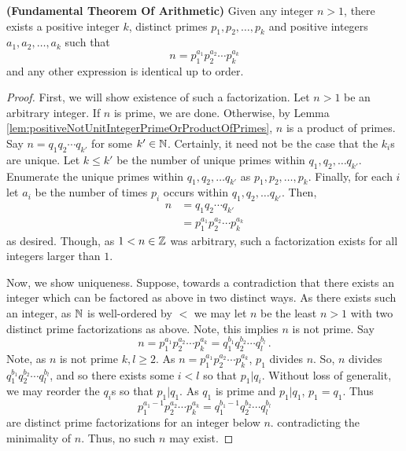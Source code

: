\guard








\begin{thm}
\label{thm:fundamentalTheoremOfArithmetic}
  \textbf{(Fundamental Theorem Of Arithmetic)}
  Given any integer $n>1$, there exists a positive integer $k$, distinct primes $p_1,p_2,\dots,p_k$ and positive integers $a_1,a_2,\dots,a_k$ such that \[ n=p_1^{a_1}p_2^{a_2}\cdots p_k^{a_k}\] and any other expression is identical up to order.
\end{thm}
\begin{proof}
  First, we will show existence of such a factorization.
  Let $n>1$ be an arbitrary integer.
  If $n$ is prime, we are done.
  Otherwise, by Lemma \ref{lem:positiveNotUnitIntegerPrimeOrProductOfPrimes}, $n$ is a product of primes.
  Say $n = q_1q_2\cdots q_{k'}$ for some $k'\in\mathbb{N}$.
  Certainly, it need not be the case that the $k_i$s are unique.
  Let $k\leq k'$ be the number of unique primes within $q_1,q_2,\dots q_{k'}$.
  Enumerate the unique primes within $q_1,q_2,\dots q_{k'}$ as $p_1,p_2,\dots,p_k$.
  Finally, for each $i$ let $a_i$ be the number of times $p_i$ occurs within  $q_1,q_2,\dots q_{k'}$.
  Then,
  \begin{align*}
    n &= q_1q_2\cdots q_{k'} \\
      &= p_1^{a_1}p_2^{a_2}\cdots p_k^{a_k}
  \end{align*}
  as desired.
  Though, as $1<n\in\mathbb{Z}$ was arbitrary, such a factorization exists for all integers larger than $1$.


  Now, we show uniqueness.
  Suppose, towards a contradiction that there exists an integer which can be factored as above in two distinct ways.
  As there exists such an integer, as $\mathbb{N}$ is well-ordered by $<$ we may let $n$ be the least $n>1$ with two distinct prime factorizations as above.
  Note, this implies $n$ is not prime.
  Say \[n=p_1^{a_1}p_2^{a_2}\cdots p_k^{a_k} =q_1^{b_1}q_2^{b_2}\cdots q_l^{b_l}\,.\]
  Note, as $n$ is not prime $k,l\geq 2$.
  As $n=p_1^{a_1}p_2^{a_2}\cdots p_k^{a_k}$, $p_1$ divides $n$.
  So, $n$ divides $q_1^{b_1}q_2^{b_2}\cdots q_l^{b_l}$, and so there exists some $i<l$ so that $p_1\vert q_i$.
  Without loss of generalit, we may reorder the $q_i$s so that $p_1\vert q_1$.
  As $q_1$ is prime and $p_1\vert q_1$, $p_1=q_1$.
  Thus \[ p_1^{a_1-1}p_2^{a_2}\cdots p_k^{a_k} = q_1^{b_1-1}q_2^{b_2}\cdots q_l^{b_l}\] are distinct prime factorizations for an integer below $n$. contradicting the minimality of $n$.
  Thus, no such $n$ may exist.
\end{proof}
